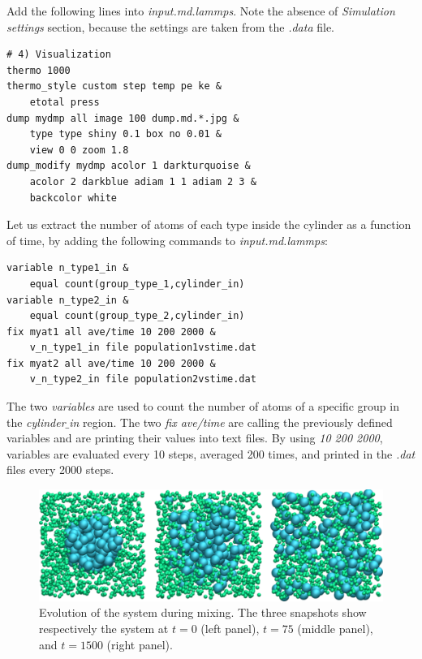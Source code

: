 \documentclass[9pt,tutorial]{livecoms}
\begin{document}
Add the following lines into \textit{input.md.lammps}. Note the absence of \textit{Simulation settings} section, because the settings are taken from the \textit{.data} file.
{\normalsize \begin{verbatim}
# 4) Visualization
thermo 1000
thermo_style custom step temp pe ke &
    etotal press
dump mydmp all image 100 dump.md.*.jpg &
    type type shiny 0.1 box no 0.01 &
    view 0 0 zoom 1.8
dump_modify mydmp acolor 1 darkturquoise &
    acolor 2 darkblue adiam 1 1 adiam 2 3 &
    backcolor white
\end{verbatim}}
Let us extract the number of atoms of each type inside the cylinder as a function of time, by adding the following commands to \textit{input.md.lammps}:
{\normalsize \begin{verbatim}
variable n_type1_in &
    equal count(group_type_1,cylinder_in)
variable n_type2_in &
    equal count(group_type_2,cylinder_in)
fix myat1 all ave/time 10 200 2000 &
    v_n_type1_in file population1vstime.dat
fix myat2 all ave/time 10 200 2000 &
    v_n_type2_in file population2vstime.dat
\end{verbatim}}
The two \textit{variables} are used to count the number of atoms of a specific group in the \textit{cylinder$\_$in} region. The two \textit{fix ave/time} are calling the previously defined variables and are printing their values into text files. By using \textit{10 200 2000}, variables are evaluated every 10 steps, averaged 200 times, and printed in the \textit{.dat} files every 2000 steps.

\begin{figure}
\centering
\includegraphics[width=\linewidth]{LJ-evolution}
\caption{Evolution of the system during mixing. The three snapshots show respectively the system at $t=0$ (left panel), $t=75$ (middle panel), and $t=1500$ (right panel).}
\label{fig:evolution-population}
\end{figure}
\end{document}
